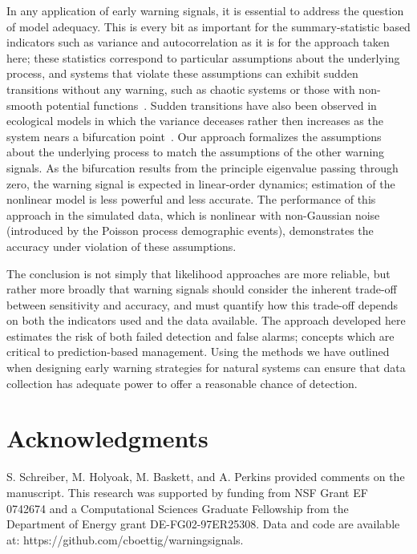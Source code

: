 \documentclass[authoryear,preprint,11pt]{elsarticle}
\begin{document}
In any application of early warning signals, it is essential to address the question of model adequacy.  
This is every bit as important for the summary-statistic based indicators such as variance and autocorrelation
as it is for the approach taken here; these statistics correspond to particular assumptions about the underlying process,
and systems that violate these assumptions can exhibit sudden transitions without any warning,
such as chaotic systems or those with non-smooth potential functions~\citep{Hastings2010}.
Sudden transitions have also been observed in ecological models in which 
the variance deceases rather then increases as the system nears a bifurcation point~\citep{Schreiber2003, Schreiber2008, Dakos2011a}.  
Our approach formalizes the assumptions about the underlying process to match the assumptions of the other warning signals.  
As the bifurcation results from the principle eigenvalue passing through zero, 
the warning signal is expected in linear-order dynamics;
estimation of the nonlinear model is less powerful and less accurate.  
The performance of this approach in the simulated data, which is nonlinear with non-Gaussian noise 
(introduced by the Poisson process demographic events), 
demonstrates the accuracy under violation of these assumptions.  


The conclusion is not simply that likelihood approaches are more reliable, 
but rather more broadly that warning signals should consider
the inherent trade-off between sensitivity and accuracy,
and must quantify how this trade-off depends on both the indicators used and the data available.  
The approach developed here estimates the risk of both failed detection and false alarms;
concepts which are critical to prediction-based management.  
Using the methods we have outlined when designing early warning strategies for natural systems
can ensure that data collection has adequate power to offer a reasonable chance of detection. 


\section{Acknowledgments}
S. Schreiber, M. Holyoak, M. Baskett, and A. Perkins provided comments on the manuscript.  This research was supported by funding from NSF Grant EF 0742674 and a Computational Sciences Graduate Fellowship from the Department of Energy grant DE-FG02-97ER25308. Data and code are available at: https://github.com/cboettig/warningsignals. 
\end{document}
